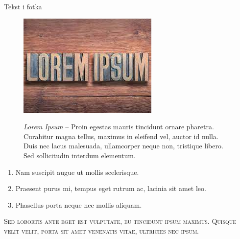 \documentclass{beamer}
\begin{document}
\begin{frame}{Tekst i fotka}

\begin{figure}[htp]
\begin{minipage}{0.33\textwidth}
\centering
\includegraphics[width=\textwidth]{foto3.jpeg}
\end{minipage}
\begin{minipage}{0.66\textwidth}
\centering
\textit{Lorem Ipsum} – Proin egestas mauris tincidunt ornare pharetra. Curabitur magna tellus, maximus in eleifend vel, auctor id nulla. 
Duis nec lacus malesuada, ullamcorper neque non, tristique libero. Sed sollicitudin interdum elementum. 
\end{minipage}
\end{figure}
    
\end{frame}
\begin{frame}[label=Listaloremów]

\begin{enumerate}
\item Nam suscipit augue ut mollis scelerisque.
\item Praesent purus mi, tempus eget rutrum ac, lacinia sit amet leo.
\item Phasellus porta neque nec mollis aliquam. 
\end{enumerate}
\textsc{Sed lobortis ante eget est vulputate, eu tincidunt ipsum maximus. Quisque velit velit, porta sit amet venenatis vitae, ultricies 
nec ipsum.}

\end{frame}
\end{document}
